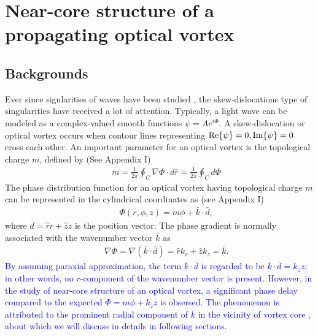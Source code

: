 \section{Near-core structure of a propagating optical vortex \cite{Near16}}
\subsection{Backgrounds}
Ever since sigularities of waves have been studied \cite{Ber73}, the skew-dislocations type of singularities have received a lot of attention. 
Typically, a light wave can be modeled as a complex-valued smooth functions $\psi = A e^{i \Phi}$. 
A skew-dislocation or optical vortex occurs when contour lines representing ${\rm Re} \{ \psi \} = 0, {\rm Im} \{ \psi \} = 0$ 
cross each other. 
An important parameter for an optical vortex is the topological charge $m$, defined by (See Appendix I)
\begin{eqnarray}
	&&m = \frac{1}{2\pi} \oint_C \nabla \Phi \cdot d\bar{r} = \frac{1}{2\pi} \oint_C d\Phi
\end{eqnarray}
The phase distribution function for an optical vortex having topological charge $m$ can be represented in the cylindrical coordinates as
(see Appendix I)
\begin{eqnarray}
	&&\Phi(r, \phi, z) = m \phi + \bar{k} \cdot \bar{d},
	\label{eq:phase}
\end{eqnarray}
where $\bar{d} = \hat{r} r + \hat{z} z$ is the position vector. The phase gradient is normally associated with the wavenumber vector $\bar{k}$ as
\begin{eqnarray}
	&&\nabla \Phi = \nabla (\bar{k} \cdot \bar{d}) = \hat{r} k_{r} + \hat{z} k_z = \bar{k}.
\end{eqnarray}
\textcolor{blue}{
By assuming paraxial approximation, the term $\bar{k} \cdot \bar{d}$ is regarded to be $\bar{k} \cdot \bar{d} = k_z z$; in other words, no $r$-component of the wavenumber vector is present. However, in the study of near-core structure of an optical vortex, a significant phase delay compared to the expected $\Phi = m\phi + k_z z$ is obsersed. The phenomenon is attributed to the prominent radial component of $\bar{k}$ in the vicinity of vortex core \cite{Near16}, about which we will discuss in details in following sections.
}

